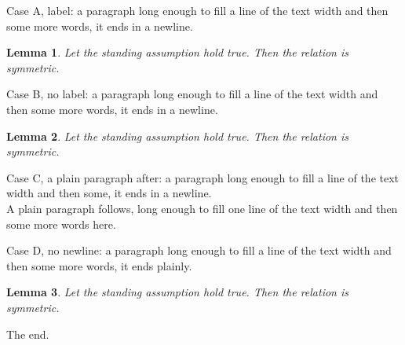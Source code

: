 \documentclass[12pt]{article}
\newtheorem{lemma}{Lemma}
\begin{document}
\baselineskip20pt
Case A, label: a paragraph long enough to fill a line of the text width and then some more words, it ends in a newline.\\
\begin{lemma}\label{a}
Let the standing assumption hold true. Then the relation is symmetric.
\end{lemma}
Case B, no label: a paragraph long enough to fill a line of the text width and then some more words, it ends in a newline.\\
\begin{lemma}
Let the standing assumption hold true. Then the relation is symmetric.
\end{lemma}
Case C, a plain paragraph after: a paragraph long enough to fill a line of the text width and then some, it ends in a newline.\\

A plain paragraph follows, long enough to fill one line of the text width and then some more words here.

Case D, no newline: a paragraph long enough to fill a line of the text width and then some more words, it ends plainly.
\begin{lemma}\label{d}
Let the standing assumption hold true. Then the relation is symmetric.
\end{lemma}
The end.
\end{document}
